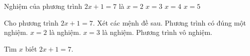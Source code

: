 \begin{ex}
Nghiệm của phương trình $2x+1=7$ là
\choice
  {$x=2$}
  {\True $x=3$}
  {$x=4$}
  {$x=5$}
\end{ex}

\begin{ex}
Cho phương trình $2x+1=7$. Xét các mệnh đề sau.
\choiceTF
  {\True Phương trình có đúng một nghiệm.}
  {$x=2$ là nghiệm.}
  {\True $x=3$ là nghiệm.}
  {Phương trình vô nghiệm.}
\end{ex}

\begin{ex}
Tìm $x$ biết $2x+1=7$.
\end{ex}

